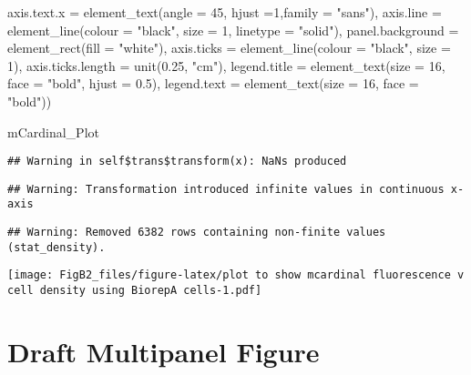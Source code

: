 \documentclass[
]{article}
\newenvironment{Shaded}{\begin{snugshade}}{\end{snugshade}}
\newcommand{\AttributeTok}[1]{\textcolor[rgb]{0.77,0.63,0.00}{#1}}
\newcommand{\DecValTok}[1]{\textcolor[rgb]{0.00,0.00,0.81}{#1}}
\newcommand{\FloatTok}[1]{\textcolor[rgb]{0.00,0.00,0.81}{#1}}
\newcommand{\FunctionTok}[1]{\textcolor[rgb]{0.00,0.00,0.00}{#1}}
\newcommand{\NormalTok}[1]{#1}
\newcommand{\StringTok}[1]{\textcolor[rgb]{0.31,0.60,0.02}{#1}}
\begin{document}
\begin{Shaded}
\begin{Highlighting}[]
    \AttributeTok{axis.text.x =} \FunctionTok{element\_text}\NormalTok{(}\AttributeTok{angle =} \DecValTok{45}\NormalTok{, }\AttributeTok{hjust =}\DecValTok{1}\NormalTok{,}\AttributeTok{family =} \StringTok{"sans"}\NormalTok{),}
    \AttributeTok{axis.line =} \FunctionTok{element\_line}\NormalTok{(}\AttributeTok{colour =} \StringTok{"black"}\NormalTok{, }\AttributeTok{size =} \DecValTok{1}\NormalTok{, }\AttributeTok{linetype =} \StringTok{"solid"}\NormalTok{),}
    \AttributeTok{panel.background =} \FunctionTok{element\_rect}\NormalTok{(}\AttributeTok{fill =} \StringTok{"white"}\NormalTok{), }
    \AttributeTok{axis.ticks =} \FunctionTok{element\_line}\NormalTok{(}\AttributeTok{colour =} \StringTok{"black"}\NormalTok{, }\AttributeTok{size =} \DecValTok{1}\NormalTok{),}
    \AttributeTok{axis.ticks.length =} \FunctionTok{unit}\NormalTok{(}\FloatTok{0.25}\NormalTok{, }\StringTok{"cm"}\NormalTok{),}
    \AttributeTok{legend.title =} \FunctionTok{element\_text}\NormalTok{(}\AttributeTok{size =} \DecValTok{16}\NormalTok{, }\AttributeTok{face =} \StringTok{"bold"}\NormalTok{, }\AttributeTok{hjust =} \FloatTok{0.5}\NormalTok{),}
    \AttributeTok{legend.text =} \FunctionTok{element\_text}\NormalTok{(}\AttributeTok{size =} \DecValTok{16}\NormalTok{, }\AttributeTok{face =} \StringTok{"bold"}\NormalTok{))}

\NormalTok{ mCardinal\_Plot}
\end{Highlighting}
\end{Shaded}

\begin{verbatim}
## Warning in self$trans$transform(x): NaNs produced
\end{verbatim}

\begin{verbatim}
## Warning: Transformation introduced infinite values in continuous x-axis
\end{verbatim}

\begin{verbatim}
## Warning: Removed 6382 rows containing non-finite values (stat_density).
\end{verbatim}

\texttt{[image: FigB2\_files/figure-latex/plot to show mcardinal fluorescence v cell density using BiorepA cells-1.pdf]}

\hypertarget{draft-multipanel-figure}{%
\section{Draft Multipanel Figure}\label{draft-multipanel-figure}}
\end{document}
